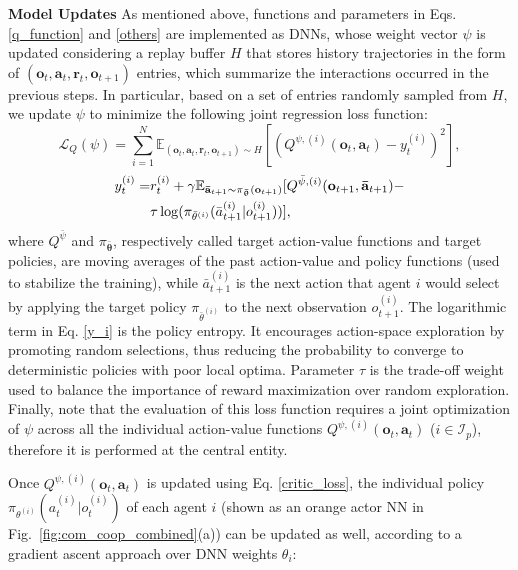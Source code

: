 \textbf{Model Updates} As mentioned above, functions and parameters in Eqs. \eqref{q_function} and \eqref{others} are implemented as DNNs, whose weight vector $\psi$ is updated considering a replay buffer $H$ that stores history trajectories in the form of $(\mathbf{o}_t, \mathbf{a}_t, \mathbf{r}_t, \mathbf{o}_{t+1})$ entries, which summarize the interactions occurred in the previous steps. In particular, based on a set of entries randomly sampled from $H$, we update $\psi$ to minimize the following joint regression loss function:
\begin{equation}
	\mathcal{L}_Q(\psi) =  \sum^{N}_{i=1}\mathbb{E}_{(\mathbf{o}_t,\mathbf{a}_t,\mathbf{r}_t,\mathbf{o}_{t+1})\sim H}[(Q^{\psi,(i)}(\mathbf{o}_t,\mathbf{a}_t)-y^{(i)}_t)^2], \label{critic_loss}
\end{equation}
\begin{align}
    y^{(i)}_t = & r^{(i)}_t + \gamma\mathbb{E}_{\mathbf{\bar{a}}_{t+1}\sim\pi_{\boldsymbol{\bar{\uptheta}}}(\mathbf{o}_{t+1})}[Q^{\bar{\psi},(i)}(\mathbf{o}_{t+1}, \mathbf{\bar{a}}_{t+1}) - \notag\\
    & \tau\log(\pi_{\bar{\theta}^{(i)}}(\bar{a}_{t+1}^{(i)}|o_{t+1}^{(i)}))],\label{y_i}
\end{align}
where $Q^{\bar{\psi}}$ and $\pi_{\boldsymbol{\bar{\uptheta}}}$, respectively called target action-value functions and target policies, are moving averages of the past action-value and policy functions (used to stabilize the training), while $\bar{a}_{t+1}^{(i)}$ is the next action that agent $i$ would select by applying the target policy $\pi_{\bar{\theta}^{(i)}}$ to the next observation $o_{t+1}^{(i)}$. 
The logarithmic term in Eq. \eqref{y_i} is the policy entropy. It encourages action-space exploration by promoting random selections, thus reducing the probability to converge to deterministic policies with poor local optima.
Parameter $\tau$ is the trade-off weight used to balance the importance of reward maximization over random exploration.
Finally, note that the evaluation of this loss function requires a joint optimization of $\psi$ across all the individual action-value functions $Q^{\psi,(i)}(\mathbf{o}_t,\mathbf{a}_t)$ ($i\in\mathcal{I}_p$), therefore it is performed at the central entity.

Once $Q^{\psi,(i)}(\mathbf{o}_t,\mathbf{a}_t)$ is updated using Eq. \eqref{critic_loss}, the individual policy $\pi_{\theta^{(i)}}(a^{(i)}_t | o^{(i)}_t)$ of each agent $i$ (shown as an orange actor NN in Fig.~\ref{fig:com_coop_combined}(a)) can be updated as well, according to a gradient ascent approach over DNN weights $\theta_i$:

